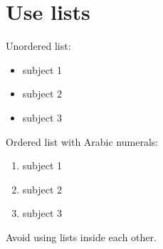 \documentclass[11pt, a4paper]{report}
\begin{document}
\section{Use lists}
Unordered list:
\begin{itemize}
    \item subject 1
    \item subject 2
    \item subject 3
\end{itemize}

Ordered list with Arabic numerals:
\begin{enumerate}
    \item subject 1
    \item subject 2
    \item subject 3
\end{enumerate}

Avoid using lists inside each other.

\printbibliography


\appendix
\end{document}
